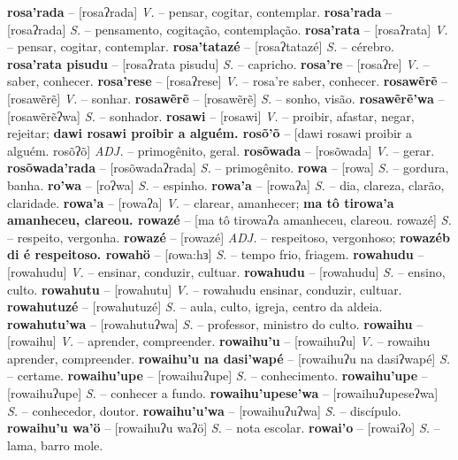 \textbf{rosa'rada} -- [rosaʔrada] \textit{V.} -- pensar, cogitar, contemplar.
\textbf{rosa'rada} -- [rosaʔrada] \textit{S.} -- pensamento, cogitação, contemplação.
\textbf{rosa'rata} -- [rosaʔrata] \textit{V.} -- pensar, cogitar, contemplar.
\textbf{rosa'tatazé} -- [rosaʔtatazé] \textit{S.} -- cérebro.
\textbf{rosa'rata pisudu} -- [rosaʔrata pisudu] \textit{S.} -- capricho.
\textbf{rosa're} -- [rosaʔre] \textit{V.} -- saber, conhecer.
\textbf{rosa'rese} -- [rosaʔrese] \textit{V.} -- rosa're saber, conhecer.
\textbf{rosawẽrẽ} -- [rosawẽrẽ] \textit{V.} -- sonhar.
\textbf{rosawẽrẽ} -- [rosawẽrẽ] \textit{S.} -- sonho, visão.
\textbf{rosawẽrẽ'wa} -- [rosawẽrẽʔwa] \textit{S.} -- sonhador.
\textbf{rosawi} -- [rosawi] \textit{V.} -- proibir, afastar, negar, rejeitar;
\textbf{dawi rosawi proibir a alguém. rosõ'õ} -- [dawi rosawi proibir a alguém. rosõʔõ] \textit{ADJ.} -- primogênito, geral.
\textbf{rosõwada} -- [rosõwada] \textit{V.} -- gerar.
\textbf{rosõwada'rada} -- [rosõwadaʔrada] \textit{S.} -- primogênito.
\textbf{rowa} -- [rowa] \textit{S.} -- gordura, banha.
\textbf{ro'wa} -- [roʔwa] \textit{S.} -- espinho.
\textbf{rowa'a} -- [rowaʔa] \textit{S.} -- dia, clareza, clarão, claridade.
\textbf{rowa'a} -- [rowaʔa] \textit{V.} -- clarear, amanhecer;
\textbf{ma tô tirowa'a amanheceu, clareou. rowazé} -- [ma tô tirowaʔa amanheceu, clareou. rowazé] \textit{S.} -- respeito, vergonha.
\textbf{rowazé} -- [rowazé] \textit{ADJ.} -- respeitoso, vergonhoso;
\textbf{rowazéb di é respeitoso. rowahö} -- [ɾowa:hɜ] \textit{S.} -- tempo frio, friagem.
\textbf{rowahudu} -- [rowahudu] \textit{V.} -- ensinar, conduzir, cultuar.
\textbf{rowahudu} -- [rowahudu] \textit{S.} -- ensino, culto.
\textbf{rowahutu} -- [rowahutu] \textit{V.} -- rowahudu ensinar, conduzir, cultuar.
\textbf{rowahutuzé} -- [rowahutuzé] \textit{S.} -- aula, culto, igreja, centro da aldeia.
\textbf{rowahutu'wa} -- [rowahutuʔwa] \textit{S.} -- professor, ministro do culto.
\textbf{rowaihu} -- [rowaihu] \textit{V.} -- aprender, compreender.
\textbf{rowaihu'u} -- [rowaihuʔu] \textit{V.} -- rowaihu aprender, compreender.
\textbf{rowaihu'u na dasi'wapé} -- [rowaihuʔu na dasiʔwapé] \textit{S.} -- certame.
\textbf{rowaihu'upe} -- [rowaihuʔupe] \textit{S.} -- conhecimento.
\textbf{rowaihu'upe} -- [rowaihuʔupe] \textit{S.} -- conhecer a fundo.
\textbf{rowaihu'upese'wa} -- [rowaihuʔupeseʔwa] \textit{S.} -- conhecedor, doutor.
\textbf{rowaihu'u'wa} -- [rowaihuʔuʔwa] \textit{S.} -- discípulo.
\textbf{rowaihu'u wa'ö} -- [rowaihuʔu waʔö] \textit{S.} -- nota escolar.
\textbf{rowai'o} -- [rowaiʔo] \textit{S.} -- lama, barro mole.
